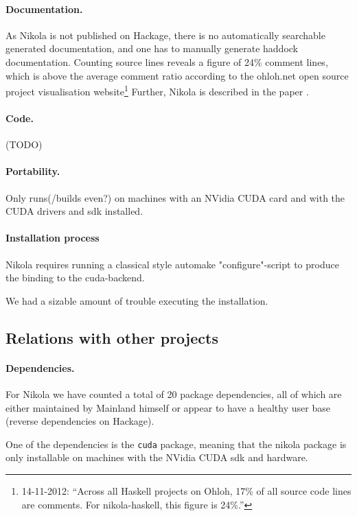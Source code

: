 \paragraph{Documentation.} As Nikola is not published on Hackage, there is no
automatically searchable generated documentation, and one has to manually
generate haddock documentation. Counting source lines reveals a figure of 24\%
comment lines, which is above the average comment ratio according to the
ohloh.net open source project visualisation website\footnote{14-11-2012:
``Across all Haskell projects on Ohloh, 17\% of all source code lines are
comments. For nikola-haskell, this figure is 24\%.''} Further, Nikola is
described in the paper \cite{mainland2010nikola}.

\paragraph{Code.} (TODO)

\paragraph{Portability.} Only runs(/builds even?) on machines with an NVidia
CUDA card and with the CUDA drivers and sdk installed.

\paragraph{Installation process} Nikola requires running a classical style
automake "configure"-script to produce the binding to the cuda-backend.

We had a sizable amount of trouble executing the installation. 

\subsection{Relations with other projects}

\paragraph{Dependencies.} For Nikola we have counted a total of 20 package
dependencies, all of which are either maintained by Mainland himself or appear
to have a healthy user base (reverse dependencies on Hackage).

One of the dependencies is the \texttt{cuda} package, meaning that the nikola
package is only installable on machines with the NVidia CUDA sdk and hardware.

